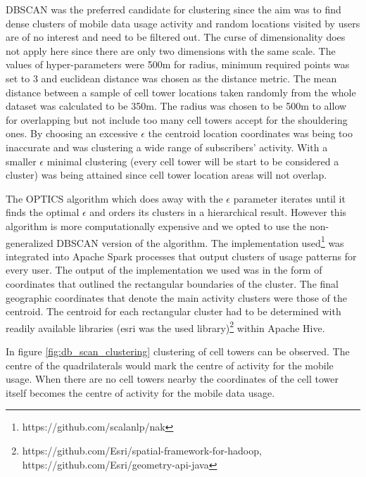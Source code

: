 \documentclass[12pt, a4paper]{report}
\theoremstyle{definition}
\theoremstyle{definition}%
\theoremstyle{definition}%
\theoremstyle{definition}%
\theoremstyle{definition}%
\theoremstyle{definition}%
\begin{document}
DBSCAN was the preferred candidate for clustering since the aim was to find dense clusters of mobile data usage activity and random locations visited by users are of no interest and need to be filtered out. The curse of dimensionality does not apply here since there are only two dimensions with the same scale.  The values of hyper-parameters were 500m for radius, minimum required points was set to 3 and euclidean distance was chosen as the distance metric. The mean distance between a sample of cell tower locations taken randomly from the whole dataset was calculated to be 350m. The radius was chosen to be 500m to allow for overlapping but not include too many cell towers accept for the shouldering ones. By choosing an excessive $\epsilon$ the centroid location coordinates was being too inaccurate and was clustering a wide range of subscribers' activity. With a smaller $\epsilon$ minimal clustering (every cell tower will be start to be considered a cluster) was being attained since cell tower location areas will not overlap. 

The OPTICS algorithm which does away with the $\epsilon$ parameter iterates until it finds the optimal $\epsilon$ and orders its clusters in a hierarchical result. However this algorithm is more computationally expensive and we opted to use the non-generalized DBSCAN version of the algorithm. The implementation used\footnote{https://github.com/scalanlp/nak} was integrated into Apache Spark processes that output clusters of usage patterns for every user. The output of the implementation we used was in the form of coordinates that outlined the rectangular boundaries of the cluster. The final geographic coordinates that denote the main activity clusters were those of the centroid. The centroid for each rectangular cluster had to be determined with readily available libraries (esri was the used library)\footnote{https://github.com/Esri/spatial-framework-for-hadoop, https://github.com/Esri/geometry-api-java} within Apache Hive. 

In figure \ref{fig:db_scan_clustering} clustering of cell towers can be observed. The centre of the quadrilaterals would mark the centre of activity for the mobile usage. When there are no cell towers nearby the coordinates of the cell tower itself becomes the centre of activity for the mobile data usage. 


\end{document}
